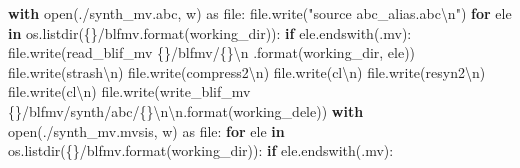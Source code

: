 \documentclass[
  italian,
]{book}
\newenvironment{Shaded}{\begin{snugshade}}{\end{snugshade}}
\newcommand{\BuiltInTok}[1]{#1}
\newcommand{\CharTok}[1]{\textcolor[rgb]{0.31,0.60,0.02}{#1}}
\newcommand{\ControlFlowTok}[1]{\textcolor[rgb]{0.13,0.29,0.53}{\textbf{#1}}}
\newcommand{\ImportTok}[1]{#1}
\newcommand{\KeywordTok}[1]{\textcolor[rgb]{0.13,0.29,0.53}{\textbf{#1}}}
\newcommand{\NormalTok}[1]{#1}
\newcommand{\SpecialCharTok}[1]{\textcolor[rgb]{0.00,0.00,0.00}{#1}}
\newcommand{\StringTok}[1]{\textcolor[rgb]{0.31,0.60,0.02}{#1}}
\begin{document}
\begin{Shaded}
\begin{Highlighting}[]
  \ControlFlowTok{with} \BuiltInTok{open}\NormalTok{(}\StringTok{\textquotesingle{}./synth\_mv.abc\textquotesingle{}}\NormalTok{, }\StringTok{\textquotesingle{}w\textquotesingle{}}\NormalTok{) }\ImportTok{as} \BuiltInTok{file}\NormalTok{:}
    \BuiltInTok{file}\NormalTok{.write(}\StringTok{"source abc\_alias.abc}\CharTok{\textbackslash{}n}\StringTok{"}\NormalTok{)}
    \ControlFlowTok{for}\NormalTok{ ele }\KeywordTok{in}\NormalTok{ os.listdir(}\StringTok{\textquotesingle{}}\SpecialCharTok{\{\}}\StringTok{/blfmv\textquotesingle{}}\NormalTok{.}\BuiltInTok{format}\NormalTok{(working\_dir)):}
      \ControlFlowTok{if}\NormalTok{ ele.endswith(}\StringTok{\textquotesingle{}.mv\textquotesingle{}}\NormalTok{):}
        \BuiltInTok{file}\NormalTok{.write(}\StringTok{\textquotesingle{}read\_blif\_mv }\SpecialCharTok{\{\}}\StringTok{/blfmv/}\SpecialCharTok{\{\}}\CharTok{\textbackslash{}n}\StringTok{\textquotesingle{}}
\NormalTok{          .}\BuiltInTok{format}\NormalTok{(working\_dir, ele))}
        \BuiltInTok{file}\NormalTok{.write(}\StringTok{\textquotesingle{}strash}\CharTok{\textbackslash{}n}\StringTok{\textquotesingle{}}\NormalTok{)}
        \BuiltInTok{file}\NormalTok{.write(}\StringTok{\textquotesingle{}compress2}\CharTok{\textbackslash{}n}\StringTok{\textquotesingle{}}\NormalTok{)}
        \BuiltInTok{file}\NormalTok{.write(}\StringTok{\textquotesingle{}cl}\CharTok{\textbackslash{}n}\StringTok{\textquotesingle{}}\NormalTok{)}
        \BuiltInTok{file}\NormalTok{.write(}\StringTok{\textquotesingle{}resyn2}\CharTok{\textbackslash{}n}\StringTok{\textquotesingle{}}\NormalTok{)}
        \BuiltInTok{file}\NormalTok{.write(}\StringTok{\textquotesingle{}cl}\CharTok{\textbackslash{}n}\StringTok{\textquotesingle{}}\NormalTok{)}
        \BuiltInTok{file}\NormalTok{.write(}\StringTok{\textquotesingle{}write\_blif\_mv }\SpecialCharTok{\{\}}\StringTok{/blfmv/synth/abc/}\SpecialCharTok{\{\}}\CharTok{\textbackslash{}n\textbackslash{}n}\StringTok{\textquotesingle{}}\NormalTok{.}\BuiltInTok{format}\NormalTok{(working\_dele))}
  \ControlFlowTok{with} \BuiltInTok{open}\NormalTok{(}\StringTok{\textquotesingle{}./synth\_mv.mvsis\textquotesingle{}}\NormalTok{, }\StringTok{\textquotesingle{}w\textquotesingle{}}\NormalTok{) }\ImportTok{as} \BuiltInTok{file}\NormalTok{:}
    \ControlFlowTok{for}\NormalTok{ ele }\KeywordTok{in}\NormalTok{ os.listdir(}\StringTok{\textquotesingle{}}\SpecialCharTok{\{\}}\StringTok{/blfmv\textquotesingle{}}\NormalTok{.}\BuiltInTok{format}\NormalTok{(working\_dir)):}
      \ControlFlowTok{if}\NormalTok{ ele.endswith(}\StringTok{\textquotesingle{}.mv\textquotesingle{}}\NormalTok{):}

\end{Highlighting}
\end{Shaded}
\end{document}
